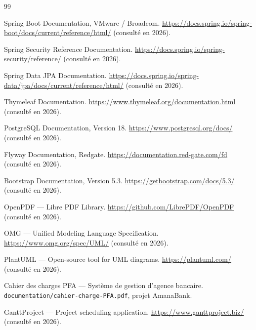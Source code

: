 \documentclass[11pt,a4paper,oneside]{report}
\newcommand{\nomapplication}{AmanaBank}
\begin{document}
\begin{thebibliography}{99}

Spring Boot Documentation, VMware / Broadcom.
\url{https://docs.spring.io/spring-boot/docs/current/reference/html/} (consulté en 2026).

Spring Security Reference Documentation.
\url{https://docs.spring.io/spring-security/reference/} (consulté en 2026).

Spring Data JPA Documentation.
\url{https://docs.spring.io/spring-data/jpa/docs/current/reference/html/} (consulté en 2026).

Thymeleaf Documentation.
\url{https://www.thymeleaf.org/documentation.html} (consulté en 2026).

PostgreSQL Documentation, Version 18.
\url{https://www.postgresql.org/docs/} (consulté en 2026).

Flyway Documentation, Redgate.
\url{https://documentation.red-gate.com/fd} (consulté en 2026).

Bootstrap Documentation, Version 5.3.
\url{https://getbootstrap.com/docs/5.3/} (consulté en 2026).

OpenPDF — Libre PDF Library.
\url{https://github.com/LibrePDF/OpenPDF} (consulté en 2026).

OMG — Unified Modeling Language Specification.
\url{https://www.omg.org/spec/UML/} (consulté en 2026).

PlantUML — Open-source tool for UML diagrams.
\url{https://plantuml.com/} (consulté en 2026).

Cahier des charges PFA — Système de gestion d'agence bancaire.
\texttt{documentation/cahier-charge-PFA.pdf}, projet \nomapplication.

GanttProject — Project scheduling application.
\url{https://www.ganttproject.biz/} (consulté en 2026).

\end{thebibliography}
\end{document}
